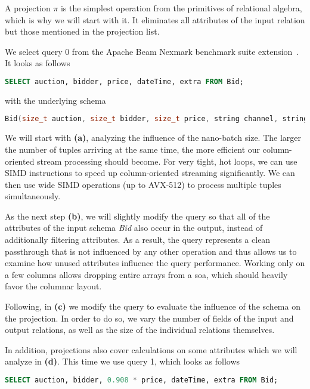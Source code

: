 A projection $\pi$ is the simplest operation from the primitives of relational algebra, which is why we will start with it.
It eliminates all attributes of the input relation but those mentioned in the projection list.

We select query 0 from the Apache Beam Nexmark benchmark suite extension~\cite[]{apachebeam}.
It looks as follows

\begin{lstlisting}[language=SQL]
SELECT auction, bidder, price, dateTime, extra FROM Bid;
\end{lstlisting}
with the underlying schema
\begin{lstlisting}[language=c++]
Bid(size_t auction, size_t bidder, size_t price, string channel, string url, time_t dateTime, string extra);
\end{lstlisting}

We will start with \textbf{(a)}, analyzing the influence of the nano-batch size.
The larger the number of tuples arriving at the same time, the more efficient our column-oriented stream processing should become.
For very tight, hot loops, we can use SIMD instructions to speed up column-oriented streaming significantly.
We can then use wide SIMD operations (up to AVX-512) to process multiple tuples simultaneously.

As the next step \textbf{(b)}, we will slightly modify the query so that all of the attributes of the input schema \emph{Bid} also occur in the output, instead of additionally filtering attributes.
As a result, the query represents a clean passthrough that is not influenced by any other operation and thus allows us to examine how unused attributes influence the query performance.
Working only on a few columns allows dropping entire arrays from a \ac{soa}, which should heavily favor the columnar layout.

Following, in \textbf{(c)} we modify the query to evaluate the influence of the schema on the projection.
In order to do so, we vary the number of fields of the input and output relations, as well as the size of the individual relations themselves.

In addition, projections also cover calculations on some attributes which we will analyze in \textbf{(d)}.
This time we use query 1, which looks as follows

\begin{lstlisting}[language=SQL]
SELECT auction, bidder, 0.908 * price, dateTime, extra FROM Bid;
\end{lstlisting}

